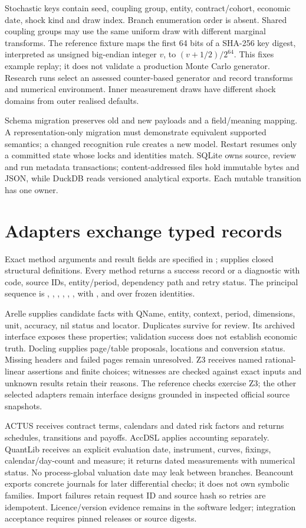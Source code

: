 Stochastic keys contain seed, coupling group, entity, contract/cohort,
economic date, shock kind and draw index. Branch enumeration order is absent.
Shared coupling groups may use the same uniform draw with different marginal
transforms. The reference fixture maps the first 64 bits of a SHA-256 key
digest, interpreted as unsigned big-endian integer $v$, to
$(v+1/2)/2^{64}$. This fixes example replay; it does not validate a production
Monte Carlo generator. Research runs select an assessed counter-based
generator and record transforms and numerical environment. Inner measurement
draws have different shock domains from outer realised defaults.

Schema migration preserves old and new payloads and a field/meaning mapping.
A representation-only migration must demonstrate equivalent supported
semantics; a changed recognition rule creates a new model. Restart resumes
only a committed state whose locks and identities match. SQLite owns source,
review and run metadata transactions; content-addressed files hold immutable
bytes and JSON, while DuckDB reads versioned analytical exports. Each mutable
transition has one owner.

\section{Adapters exchange typed records}

Exact method arguments and result fields are specified in
;  supplies closed
structural definitions. Every method returns a success record or a
diagnostic with code, source IDs, entity/period, dependency path and retry
status. The principal sequence is , ,
, , , , with
,  and  over frozen identities.

Arelle supplies candidate facts with QName, entity, context, period,
dimensions, unit, accuracy, nil status and locator. Duplicates survive for
review. Its archived  interface exposes these
properties; validation success does not establish economic truth. Docling
supplies page/table proposals, locations and conversion status. Missing
headers and failed pages remain unresolved. Z3 receives named rational-linear
assertions and finite choices; witnesses are checked against exact inputs and
unknown results retain their reasons. The reference checks exercise Z3;
the other selected adapters remain interface designs grounded in inspected
official source snapshots.

ACTUS receives contract terms, calendars and dated risk factors and returns
schedules, transitions and payoffs. AccDSL applies accounting separately.
QuantLib receives an explicit evaluation date, instrument, curves, fixings,
calendar/day-count and measure; it returns dated measurements with numerical
status. No process-global valuation date may leak between branches.
Beancount exports concrete journals for later differential checks; it does
not own symbolic families. Import failures retain request ID and source hash
so retries are idempotent. Licence/version evidence remains in the software
ledger; integration acceptance requires pinned releases or source digests.
